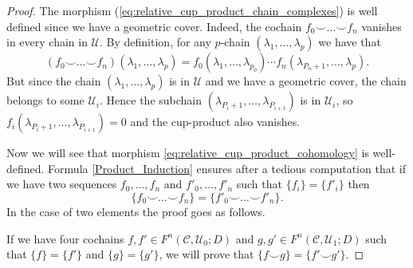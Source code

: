\documentclass[10pt,a4paper]{amsart}
\newcommand{\CC}{\mathcal{C}}
\newcommand{\Uc}{\mathcal{U}}
\begin{document}
\begin{proof}
    The morphism (\ref{eq:relative_cup_product_chain_complexes})
    is well defined since we have a geometric cover. Indeed, the cochain $f_0 \smile \dots \smile f_n$ vanishes in every chain in $\Uc$. By definition, for any $p$-chain $(\lambda_1,\ldots,\lambda_{p})$ we have that
    $$(f_0 \smile \dots \smile f_n)(\lambda_1,\dots,\lambda_{p})=f_0(\lambda_1,\dots,\lambda_{p_0})  \cdots f_n(\lambda_{P_n+1},\dots,\lambda_{p}).$$ But since the chain $(\lambda_1,\ldots,\lambda_{p})$ is in $\Uc$ and we have a geometric cover, the chain belongs to some $\Uc_i$. Hence the subchain $(\lambda_{P_i+1},\dots,\lambda_{P_{i+1}})$ is in $\Uc_i$, so $f_i(\lambda_{P_i+1},\dots,\lambda_{P_{i+1}})=0$ and the cup-product also vanishes.
    
    Now we will see that morphism \eqref{eq:relative_cup_product_cohomology} is  well-defined.  Formula \eqref{Product_Induction} ensures after a tedious computation that if we have two sequences $f_0, \dots, f_n$ and $f'_0, \dots, f'_n$ such that $\{f_i\}=\{f'_i\}$ then $$\{f_0 \smile \dots \smile f_n\}=\{f'_0 \smile \dots \smile f'_n\}.$$ 
    In the case of two elements the proof goes as follows. 
    
    If we have four cochains $f, f' \in F^n(\CC,\Uc_0;D)$ and $g, g' \in F^n(\CC,\Uc_1;D)$ such that $\{f\}=\{f'\}$ and $\{g\}=\{g'\}$, we will prove that $\{f \smile g\}=\{f'\smile g'\}$. 
    

\end{proof}
\end{document}
